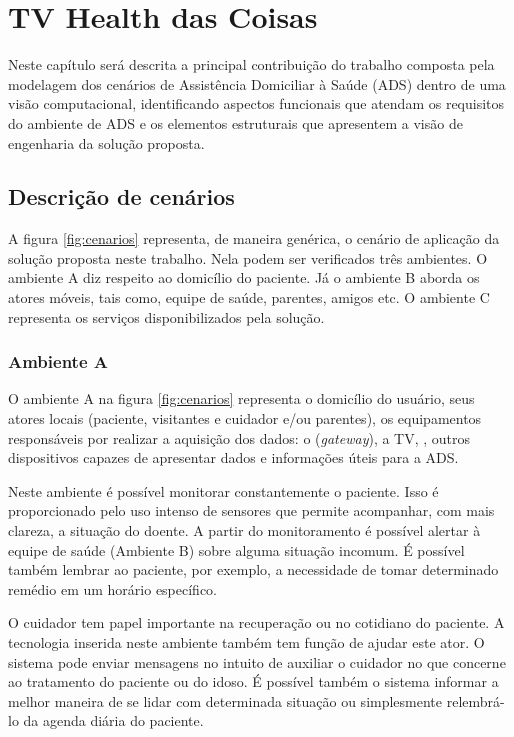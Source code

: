 \chapter{TV Health das Coisas}\label{cap:quatro}

Neste capítulo será descrita a principal contribuição do trabalho composta pela
modelagem dos cenários de Assistência Domiciliar à Saúde (ADS) dentro de uma
visão computacional, identificando aspectos funcionais que atendam os
requisitos do ambiente de ADS e os elementos estruturais que apresentem a visão
de engenharia da solução proposta.

\section{Descrição de cenários}

A figura \ref{fig:cenarios} representa, de maneira genérica, o cenário de
aplicação da solução proposta neste trabalho. Nela podem ser verificados três
ambientes. O ambiente A diz respeito ao domicílio do paciente. Já o ambiente B
aborda os atores móveis, tais como, equipe de saúde, parentes, amigos etc.  O
ambiente C representa os serviços disponibilizados pela solução.


\subsection{Ambiente A} \label{subsec:ambiente-a}

O ambiente A na figura \ref{fig:cenarios} representa o domicílio do usuário, seus atores locais (paciente,
visitantes e cuidador e/ou parentes), os equipamentos responsáveis por  realizar
a aquisição dos dados: o \stb[] (\textit{gateway}), a TV, \smartphones[], outros
dispositivos capazes de apresentar dados e informações úteis para a ADS.

Neste ambiente é possível monitorar constantemente o paciente. Isso é
proporcionado pelo uso intenso de sensores que permite acompanhar, com mais
clareza, a situação do doente. A partir do monitoramento é possível alertar à
equipe de saúde (Ambiente B) sobre alguma situação incomum. É possível também
lembrar ao paciente, por exemplo, a necessidade de tomar determinado remédio em
um horário específico.

O cuidador tem papel importante na recuperação ou no cotidiano do 
paciente. A tecnologia inserida neste ambiente também tem função de ajudar
este ator. O sistema pode enviar mensagens no intuito de auxiliar o cuidador no
que concerne ao tratamento do paciente ou do idoso. É possível também o sistema
informar a melhor maneira de se lidar com determinada situação ou simplesmente 
relembrá-lo da agenda diária do paciente.

